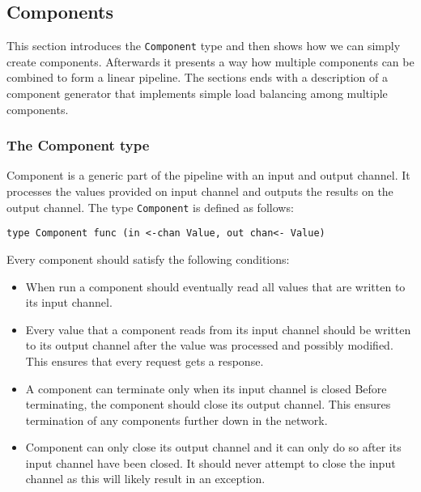 \subsection{Components}
This section introduces the \texttt{Component} type and then shows how we can simply
create components. Afterwards it presents a way how multiple components can
be combined to form a linear pipeline. The sections ends with a description
of a component generator that implements simple load balancing among
multiple components.

\subsubsection{The Component type}
Component is a generic part of the pipeline with an input and output channel.
It processes the values provided on input channel and outputs the results
on the output channel. The type \texttt{Component} is defined as follows:
\begin{lstlisting}
type Component func (in <-chan Value, out chan<- Value)
\end{lstlisting}
Every component should satisfy the following conditions:
\begin{itemize}
    \item When run a component should eventually read all values that are
          written to its input channel.

    \item Every value that a component reads from its input channel
          should be written to its output channel after the value was processed
          and possibly modified. This ensures that every request gets a response.

    \item A component can terminate only when its input channel is closed 
          Before terminating, the component should close its output channel.
          This ensures termination of any components further down in the network.

    \item Component can only close its output channel and it can only do so
    	  after its input channel have been closed. It should never attempt
          to close the input channel as this will likely result in an exception.
\end{itemize}

